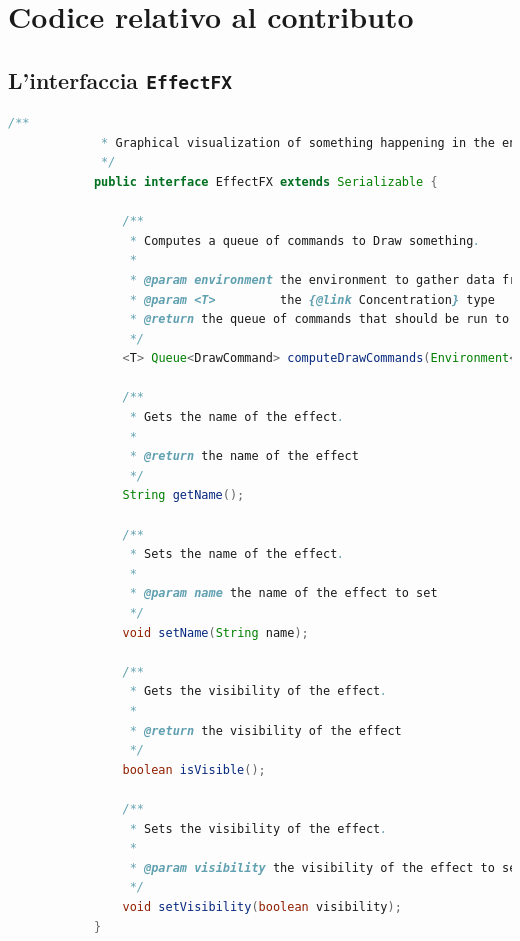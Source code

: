 \chapter{Codice relativo al contributo}\label{appendix:new}
    \section{L'interfaccia \texttt{EffectFX}}\label{appendix:effectfx}
        \begin{lstlisting}[language=Java]
            /**
             * Graphical visualization of something happening in the environment.
             */
            public interface EffectFX extends Serializable {

                /**
                 * Computes a queue of commands to Draw something.
                 *
                 * @param environment the environment to gather data from
                 * @param <T>         the {@link Concentration} type
                 * @return the queue of commands that should be run to draw the effect
                 */
                <T> Queue<DrawCommand> computeDrawCommands(Environment<T> environment);

                /**
                 * Gets the name of the effect.
                 *
                 * @return the name of the effect
                 */
                String getName();

                /**
                 * Sets the name of the effect.
                 *
                 * @param name the name of the effect to set
                 */
                void setName(String name);

                /**
                 * Gets the visibility of the effect.
                 *
                 * @return the visibility of the effect
                 */
                boolean isVisible();

                /**
                 * Sets the visibility of the effect.
                 *
                 * @param visibility the visibility of the effect to set
                 */
                void setVisibility(boolean visibility);
            }
        \end{lstlisting}


